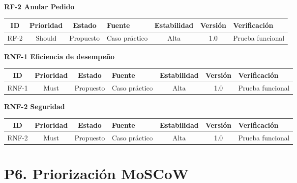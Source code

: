 \documentclass[12pt,a4paper]{article}
\renewcommand{\arraystretch}{1.18}
\begin{document}
\textbf{RF-2 Anular Pedido}

\begin{center}
\small
\setlength{\tabcolsep}{3.6pt}
\renewcommand{\arraystretch}{1.08}
\begin{tabularx}{0.98\textwidth}{|c|c|c|Y|c|c|Y|}
\hline
\textbf{ID} & \textbf{Prioridad} & \textbf{Estado} & \textbf{Fuente} & \textbf{Estabilidad} & \textbf{Versión} & \textbf{Verificación} \\
\hline
RF-2 & Should & Propuesto & Caso práctico & Alta & 1.0 & Prueba funcional \\
\hline
\end{tabularx}
\end{center}

\textbf{RNF-1 Eficiencia de desempeño}

\begin{center}
\small
\setlength{\tabcolsep}{3.6pt}
\renewcommand{\arraystretch}{1.08}
\begin{tabularx}{0.98\textwidth}{|c|c|c|Y|c|c|Y|}
\hline
\textbf{ID} & \textbf{Prioridad} & \textbf{Estado} & \textbf{Fuente} & \textbf{Estabilidad} & \textbf{Versión} & \textbf{Verificación} \\
\hline
RNF-1 & Must & Propuesto & Caso práctico & Alta & 1.0 & Prueba funcional \\
\hline
\end{tabularx}
\end{center}

\textbf{RNF-2 Seguridad}

\begin{center}
\small
\setlength{\tabcolsep}{3.6pt}
\renewcommand{\arraystretch}{1.08}
\begin{tabularx}{0.98\textwidth}{|c|c|c|Y|c|c|Y|}
\hline
\textbf{ID} & \textbf{Prioridad} & \textbf{Estado} & \textbf{Fuente} & \textbf{Estabilidad} & \textbf{Versión} & \textbf{Verificación} \\
\hline
RNF-2 & Must & Propuesto & Caso práctico & Alta & 1.0 & Prueba funcional \\
\hline
\end{tabularx}
\end{center}
\normalsize

\section*{P6. Priorización MoSCoW}
\end{document}
